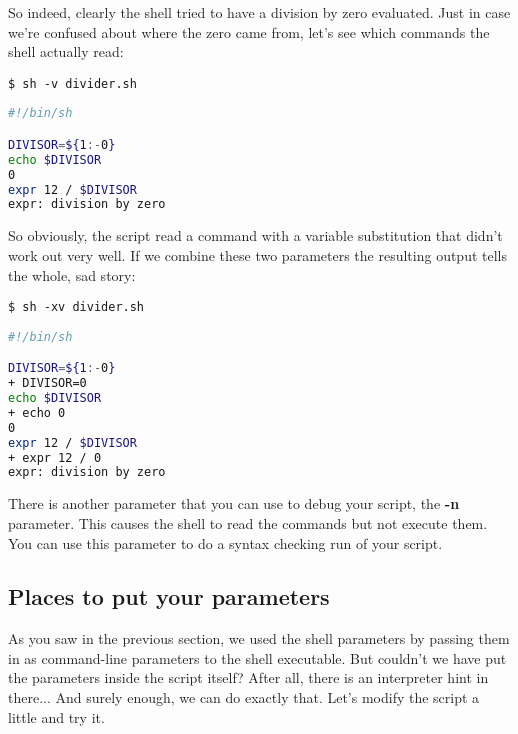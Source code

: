 So indeed, clearly the shell tried to have a division by zero evaluated. Just
in case we're confused about where the zero came from, let's see which commands
the shell actually read:

\scriptsize
\begin{verbatim}
$ sh -v divider.sh
\end{verbatim}
\normalsize

\lstset{basicstyle=\scriptsize, numbers=left, captionpos=b, tabsize=4}
\begin{lstlisting}[caption=Running the script in verbose mode,language={bash},
breaklines=true,xleftmargin=15pt,label=lst:Running the script in verbose mode]
#!/bin/sh

DIVISOR=${1:-0}
echo $DIVISOR
0
expr 12 / $DIVISOR
expr: division by zero
\end{lstlisting}

So obviously, the script read a command with a variable substitution that
didn't work out very well. If we combine these two parameters the resulting
output tells the whole, sad story:

\scriptsize
\begin{verbatim}
$ sh -xv divider.sh
\end{verbatim}
\normalsize

\lstset{basicstyle=\scriptsize, numbers=left, captionpos=b, tabsize=4}
\begin{lstlisting}[caption=Running the script with maximum debugging,language={bash},
breaklines=true,xleftmargin=15pt,label=lst:Running the script with maximum debugging]
#!/bin/sh

DIVISOR=${1:-0}
+ DIVISOR=0
echo $DIVISOR
+ echo 0
0
expr 12 / $DIVISOR
+ expr 12 / 0
expr: division by zero
\end{lstlisting}

There is another parameter that you can use to debug your script, the
\textbf{-n} parameter. This causes the shell to read the commands but not
execute them. You can use this parameter to do a syntax checking run of your
script.

\subsection{Places to put your parameters}
As you saw in the previous section, we used the shell parameters by passing
them in as command-line parameters to the shell executable. But couldn't we
have put the parameters inside the script itself? After all, there is an
interpreter hint in there... And surely enough, we can do exactly that. Let's
modify the script a little and try it.


